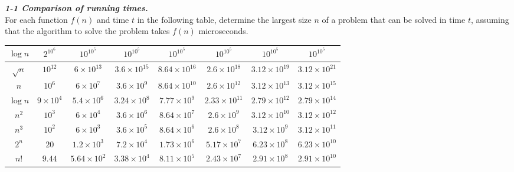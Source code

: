 \documentclass[a4paper,8pt]{article}
\begin{document}
\textbf{\textit{1-1 Comparison of running times.}}\\
For each function $f(n)$ and time $t$ in the following table, determine the
largest size $n$ of a problem that can be solved in time $t$, assuming that the
algorithm to solve the problem takes $f(n)$ microseconds.

\begin{center}
  \begin{tabular}{ *{8}{c|} }
    \hline
    $\log n$ & $2^{10^{6}}$ & $10^{10^{5}}$ & $10^{10^{5}}$ & $10^{10^{5}}$ & $10^{10^{5}}$ & $10^{10^{5}}$ & $10^{10^{5}}$ \\ \hline
    $\sqrt{n}$ & $10^{12}$ & $6 \times 10^{13}$ & $3.6 \times 10^{15}$ & $8.64 \times 10^{16}$ & $2.6 \times 10^{18}$ & $3.12 \times 10^{19}$ & $3.12 \times 10^{21}$ \\ \hline
    $n$ & $10^{6}$ & $6 \times 10^{7}$ & $3.6 \times 10^{9}$ & $8.64 \times 10^{10}$ & $2.6 \times 10^{12}$ & $3.12 \times 10^{13}$ & $3.12 \times 10^{15}$ \\ \hline
    $\log n$ & $9 \times 10^{4}$ & $5.4 \times 10^{6}$ & $3.24 \times 10^{8}$ & $7.77 \times 10^{9}$ & $2.33 \times 10^{11}$ & $2.79 \times 10^{12}$ & $2.79 \times 10^{14}$ \\ \hline
    $n^{2}$ & $10^{3}$ & $6 \times 10^{4}$ & $3.6 \times 10^{6}$ & $8.64 \times 10^{7}$ & $2.6 \times 10^{9}$ & $3.12 \times 10^{10}$ & $3.12 \times 10^{12}$ \\ \hline
    $n^{3}$ & $10^{2}$ & $6 \times 10^{3}$ & $3.6 \times 10^{5}$ & $8.64 \times 10^{6}$ & $2.6 \times 10^{8}$ & $3.12 \times 10^{9}$ & $3.12 \times 10^{11}$ \\ \hline
    $2^{n}$ & $20$ & $1.2 \times 10^{3}$ & $7.2 \times 10^{4}$ & $1.73 \times 10^{6}$ & $5.17 \times 10^{7}$ & $6.23 \times 10^{8}$ & $6.23 \times 10^{10}$ \\ \hline
    $n!$ & $9.44$ & $5.64 \times 10^{2}$ & $3.38 \times 10^{4}$ & $8.11 \times 10^{5}$ & $2.43 \times 10^{7}$ & $2.91 \times 10^{8}$ & $2.91 \times 10^{10}$ \\
    \hline
  \end{tabular}
\end{center}
\end{document}

